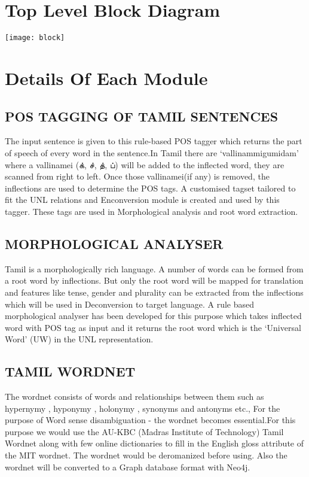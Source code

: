 \documentclass{article}
\begin{document}
\section{Top Level Block Diagram}\large
\texttt{[image: block]}

\newpage
\section{Details Of Each Module} \large
\subsection{POS TAGGING OF TAMIL SENTENCES}
The input sentence is given to this rule-based POS tagger which returns the part of speech of every word in the sentence.In Tamil there are ‘vallinammigumidam’ where a vallinamei \texttamil{(க், ச், த், ப்) } will be added to the inflected word, they are scanned from right to left. Once those vallinamei(if any) is removed, the inflections are used to determine the POS tags. A customised tagset tailored to fit the UNL relations and Enconversion module is created and used by this tagger. These tags are used in Morphological analysis and root word extraction.

\subsection{MORPHOLOGICAL ANALYSER}
Tamil is a morphologically rich language. A number of words can be formed from a root word by inflections. But only the root word will be mapped for translation and features like tense, gender and plurality can be extracted from the inflections which will be used in Deconversion to target language. A rule based morphological analyser has been developed for this purpose which takes inflected word with POS tag as input and it returns the root word which is the ‘Universal Word’ (UW) in the UNL representation.

\subsection{TAMIL WORDNET}
The wordnet consists of words and relationships between them such as hypernymy , hyponymy , holonymy , synonyms and antonyms etc., For the purpose of Word sense disambiguation - the wordnet becomes essential.For this purpose we would use the AU-KBC (Madras Institute of Technology) Tamil Wordnet along with few online dictionaries to fill in the English gloss attribute of the MIT wordnet. The wordnet would be deromanized before using. Also the wordnet will be converted to a Graph database format with Neo4j.
\end{document}
